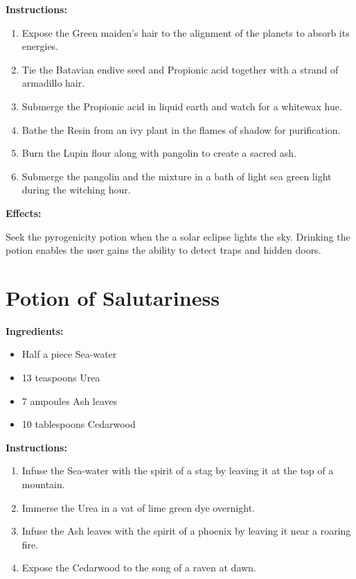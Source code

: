 \documentclass{article}
\begin{document}
\textbf{Instructions:}

\begin{enumerate}
  \item Expose the Green maiden's hair to the alignment of the planets to absorb its energies.
  \item Tie the Batavian endive seed and Propionic acid together with a strand of armadillo hair.
  \item Submerge the Propionic acid in liquid earth and watch for a whitewax hue.
  \item Bathe the Resin from an ivy plant in the flames of shadow for purification.
  \item Burn the Lupin flour along with pangolin to create a sacred ash.
  \item Submerge the pangolin and the mixture in a bath of light sea green light during the witching hour.
\end{enumerate}

\textbf{Effects:}

Seek the pyrogenicity potion when the a solar eclipse lights the sky. Drinking the potion enables the user gains the ability to detect traps and hidden doors.

\newpage
\section*{Potion of Salutariness}

\textbf{Ingredients:}

\begin{itemize}
  \item Half a piece Sea-water
  \item 13 teaspoons Urea
  \item 7 ampoules Ash leaves
  \item 10 tablespoons Cedarwood
\end{itemize}

\textbf{Instructions:}

\begin{enumerate}
  \item Infuse the Sea-water with the spirit of a stag by leaving it at the top of a mountain.
  \item Immerse the Urea in a vat of lime green dye overnight.
  \item Infuse the Ash leaves with the spirit of a phoenix by leaving it near a roaring fire.
  \item Expose the Cedarwood to the song of a raven at dawn.
\end{enumerate}
\end{document}
